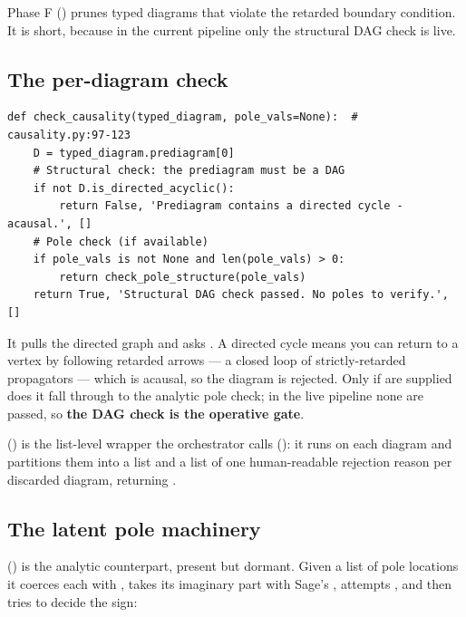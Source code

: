 Phase F () prunes typed diagrams that violate
the retarded boundary condition. It is short, because in the current pipeline
only the structural DAG check is live.

\subsection{The per-diagram check}

\begin{lstlisting}
def check_causality(typed_diagram, pole_vals=None):  # causality.py:97-123
    D = typed_diagram.prediagram[0]
    # Structural check: the prediagram must be a DAG
    if not D.is_directed_acyclic():
        return False, 'Prediagram contains a directed cycle - acausal.', []
    # Pole check (if available)
    if pole_vals is not None and len(pole_vals) > 0:
        return check_pole_structure(pole_vals)
    return True, 'Structural DAG check passed. No poles to verify.', []
\end{lstlisting}

It pulls the directed graph  and asks
. A directed cycle means you can return to a
vertex by following retarded arrows --- a closed loop of strictly-retarded
propagators --- which is acausal, so the diagram is rejected. Only if
 are supplied does it fall through to the analytic pole check;
in the live pipeline none are passed, so \textbf{the DAG check is the operative
gate}.

 () is the
list-level wrapper the orchestrator calls (): it
runs  on each diagram and partitions them into a
 list and a list of one human-readable rejection reason per discarded
diagram, returning .

\subsection{The latent pole machinery}

() is the analytic counterpart, present but dormant.
Given a list of pole locations it coerces each with , takes its
imaginary part with Sage's , attempts ,
and then tries to decide the sign:

